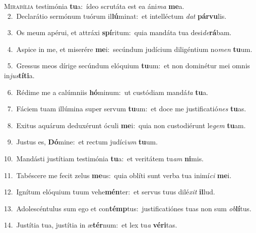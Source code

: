 \lettrine{\initial\textcolor{\initialcolor}{M}}{irabília} testimónia \textbf{tu}\-a:~\star ídeo scrutáta est ea áni\textit{ma} \textbf{me}\-a.\\
{\numbfont\textcolor{\numbcolor}{~2.}}~Declarátio sermónum tuórum il\-\textbf{lú}\-minat:~\star et intelléctum \textit{dat} \textbf{pár}\-\textbf{vu}lis.\par
{\numbfont\textcolor{\numbcolor}{~3.}}~Os meum apérui, et attráxi \textbf{spí}\-ritum:~\star quia mandáta tua desi\-\textit{de}\-\textbf{rá}bam.\par
{\numbfont\textcolor{\numbcolor}{~4.}}~Aspice in me, et miserére \textbf{me}\-i:~\star secúndum judícium diligéntium no\textit{men} \textbf{tu}\-um.\par
{\numbfont\textcolor{\numbcolor}{~5.}}~Gressus meos dírige secúndum elóquium \textbf{tu}\-um:~\star et non dominétur mei omnis in\-\textit{jus}\-\textbf{tí}\textbf{ti}a.\par
{\numbfont\textcolor{\numbcolor}{~6.}}~Rédime me a calúmniis \textbf{hó}\-minum:~\star ut custódiam mandá\textit{ta} \textbf{tu}\-a.\par
{\numbfont\textcolor{\numbcolor}{~7.}}~Fáciem tuam illúmina super servum \textbf{tu}\-um:~\star et doce me justificatió\textit{nes} \textbf{tu}\-as.\par
{\numbfont\textcolor{\numbcolor}{~8.}}~Exitus aquárum deduxérunt óculi \textbf{me}\-i:~\star quia non custodiérunt le\textit{gem} \textbf{tu}\-am.\par
{\numbfont\textcolor{\numbcolor}{~9.}}~Justus es, \textbf{Dó}\-mine:~\star et rectum judíci\textit{um} \textbf{tu}\-um.\par
{\numbfont\textcolor{\numbcolor}{10.}}~Mandásti justítiam testimónia \textbf{tu}\-a:~\star et veritátem tu\textit{am} \textbf{ni}\-mis.\par
{\numbfont\textcolor{\numbcolor}{11.}}~Tabéscere me fecit zelus \textbf{me}\-us:~\star quia oblíti sunt verba tua inimí\textit{ci} \textbf{me}\-i.\par
{\numbfont\textcolor{\numbcolor}{12.}}~Ignítum elóquium tuum vehe\-\textbf{mén}\-ter:~\star et servus tuus dilé\textit{xit} \textbf{il}\-lud.\par
{\numbfont\textcolor{\numbcolor}{13.}}~Adolescéntulus sum ego et con\-\textbf{témp}\-tus:~\star justificatiónes tuas non sum \textit{ob}\-\textbf{lí}tus.\par
{\numbfont\textcolor{\numbcolor}{14.}}~Justítia tua, justítia in æ\-\textbf{tér}\-num:~\star et lex tu\textit{a} \textbf{vé}\-\textbf{ri}tas.\par
